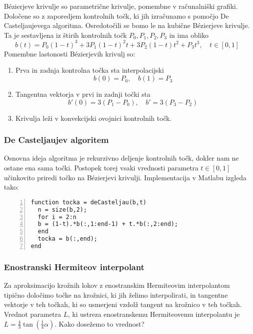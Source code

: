 \documentclass[a4paper,12pt]{article}
\begin{document}
	B\'{e}zierjeve krivulje so parametrične krivulje, pomembne v računalniški grafiki. Določene so z zaporedjem kontrolnih točk, ki jih izračunamo s pomočjo De Casteljaujevega algoritma.
	Osredotočili se bomo le na kubične B\'{e}zierjeve krivulje. Ta je sestavljena iz štirih kontrolnih točk $P_0, P_1, P_2, P_3$ in ima obliko
	\begin{equation*}
		b(t) = P_0(1-t)^3 + 3P_1(1-t)^2t + 3P_2(1-t)t^2 + P_3t^3, \quad t \in [0,1]
	\end{equation*}
	Pomembne lastonosti B\'{e}zierjevih krivulj so: 
	\begin{enumerate}[label=(\roman*)]
		\item Prva in zadnja kontrolna točka sta interpolacijski 
		$$b(0) = P_0,\quad b(1) = P_3$$
		\item Tangentna vektorja v prvi in zadnji točki sta
		$$b'(0) = 3(P_1 - P_0),\quad b' = 3(P_3 - P_2)$$
		\item Krivulja leži v konvekcijski ovojnici kontrolnih točk.

	\end{enumerate}
	
	\subsubsection{De Casteljaujev algoritem}
	
	Osnovna ideja algoritma je rekurzivno deljenje kontrolnih točk, dokler nam ne ostane ena sama točki. Postopek torej vsaki vrednosti parametra $t \in [0,1]$ učinkovito priredi
	točko na B\'{e}zierjevi krivulji.
	Implementacija v Matlabu izgleda tako:
	\begin{lstlisting}[style=Matlab-editor,numbers=left]
function tocka = deCasteljau(b,t)
  n = size(b,2);
  for i = 2:n
  b = (1-t).*b(:,1:end-1) + t.*b(:,2:end);   
  end
  tocka = b(:,end);
end
	\end{lstlisting}
	
	
	\subsubsection{Enostranski Hermiteov interpolant}
	
	Za aproksimacijo krožnih lokov z enostranskim Hermiteovim interpolantom tipično določimo točke na krožnici, ki jih želimo interpolirati, 
	in tangentne vektorje v teh točkah, ki so usmerjeni vzdolž tangent na krožnico v teh točkah. Vrednot parametra $L$, ki ustreza
	enostranskemu Hermiteovemu interpolantu je  $L = \frac{4}{3} \tan(\frac{1}{4}\alpha)$.
	Kako dosežemo to vrednost?
	
\end{document}
